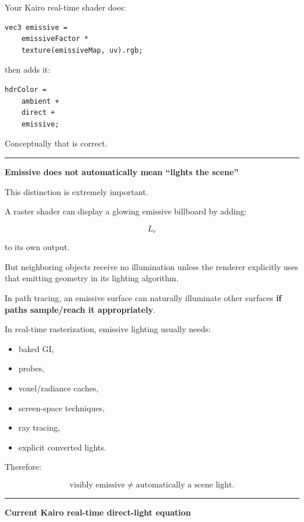 Your Kairo real-time shader does:

\begin{verbatim}
vec3 emissive =
    emissiveFactor *
    texture(emissiveMap, uv).rgb;
\end{verbatim}

then adds it:

\begin{verbatim}
hdrColor =
    ambient +
    direct +
    emissive;
\end{verbatim}

Conceptually that is correct.

\begin{center}\rule{0.5\linewidth}{0.5pt}\end{center}

\textbf{Emissive does not automatically mean ``lights the scene''}

This distinction is extremely important.

A raster shader can display a glowing emissive billboard by adding:

\[
L_e
\]

to its own output.

But neighboring objects receive no illumination unless the renderer explicitly uses that emitting geometry in its lighting algorithm.

In path tracing, an emissive surface can naturally illuminate other surfaces \textbf{if paths sample/reach it appropriately}.

In real-time rasterization, emissive lighting usually needs:

\begin{itemize}
\tightlist
\item
  baked GI,
\item
  probes,
\item
  voxel/radiance caches,
\item
  screen-space techniques,
\item
  ray tracing,
\item
  explicit converted lights.
\end{itemize}

Therefore:

\[
\boxed{
\text{visibly emissive}
\neq
\text{automatically a scene light}.
}
\]

\begin{center}\rule{0.5\linewidth}{0.5pt}\end{center}

\textbf{Current Kairo real-time direct-light equation}

